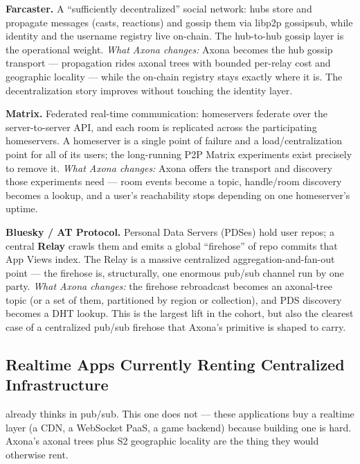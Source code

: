 \documentclass[nobib]{tufte-handout}
\begin{document}
\textbf{Farcaster.} A ``sufficiently decentralized'' social network:
hubs store and propagate messages (casts, reactions) and gossip them via
libp2p gossipsub, while identity and the username registry live
on-chain. The hub-to-hub gossip layer is the operational weight.
\emph{What Axona changes:} Axona becomes the hub gossip transport ---
propagation rides axonal trees with bounded per-relay cost and
geographic locality --- while the on-chain registry stays exactly where
it is. The decentralization story improves without touching the identity
layer.

\textbf{Matrix.} Federated real-time communication: homeservers federate
over the server-to-server API, and each room is replicated across the
participating homeservers. A homeserver is a single point of failure and
a load/centralization point for all of its users; the long-running P2P
Matrix experiments exist precisely to remove it. \emph{What Axona
changes:} Axona offers the transport and discovery those experiments
need --- room events become a topic, handle/room discovery becomes a
lookup, and a user's reachability stops depending on one homeserver's
uptime.

\textbf{Bluesky / AT Protocol.} Personal Data Servers (PDSes) hold user
repos; a central \textbf{Relay} crawls them and emits a global
``firehose'' of repo commits that App Views index. The Relay is a
massive centralized aggregation-and-fan-out point --- the firehose is,
structurally, one enormous pub/sub channel run by one party. \emph{What
Axona changes:} the firehose rebroadcast becomes an axonal-tree topic
(or a set of them, partitioned by region or collection), and PDS
discovery becomes a DHT lookup. This is the largest lift in the cohort,
but also the clearest case of a centralized pub/sub firehose that
Axona's primitive is shaped to carry.

\subsection{Realtime Apps Currently Renting Centralized Infrastructure}

 already thinks in pub/sub. This one
does not --- these applications buy a realtime layer (a CDN, a WebSocket
PaaS, a game backend) because building one is hard. Axona's axonal trees
plus S2 geographic locality are the thing they would otherwise rent.
\end{document}

